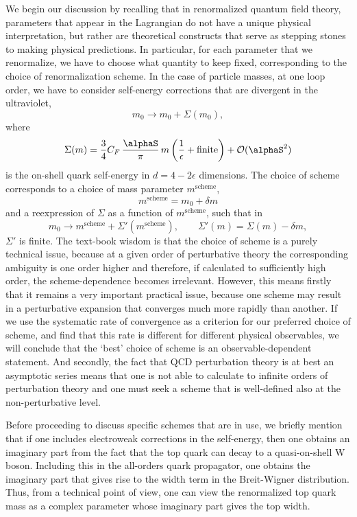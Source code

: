 We begin our discussion by recalling that in renormalized quantum field
theory, parameters that appear in the Lagrangian do not have a unique
physical interpretation, but rather are theoretical constructs that
serve as stepping stones to making physical predictions.  In particular,
for each parameter that we renormalize, we have to choose what quantity
to keep fixed, corresponding to the choice of
renormalization scheme.  In the case of particle masses, at one loop
order, we have to consider self-energy corrections that are divergent in
the ultraviolet,
\begin{equation}
  m_0 \to m_0 + \Sigma(m_0),
\end{equation}
where
\begin{equation}
  \Sigma(m) = \frac34C_F\,\frac{\alphaS}{\pi}\,m\left(\frac1\epsilon
  +\mbox{finite}\right)+\mathcal{O}(\alphaS^2)
\end{equation}
is the on-shell quark self-energy in $d=4-2\epsilon$ dimensions.  The
choice of scheme corresponds to a choice of mass parameter
$m^{\mathrm{scheme}}$,
\begin{equation}
  \label{eq:deltam}
  m^{\mathrm{scheme}}=m_0+\delta m
\end{equation}
and a reexpression of $\Sigma$ as a function of $m^{\mathrm{scheme}}$,
such that in
\begin{equation}
  m_0\to
  m^{\mathrm{scheme}}+\Sigma'(m^{\mathrm{scheme}}),
  \qquad \Sigma'(m)=\Sigma(m)-\delta m,
\end{equation}
$\Sigma'$ is finite.  The text-book wisdom is that the choice of scheme
is a purely technical issue, because at a given order of perturbative
theory the corresponding ambiguity is one order higher and therefore, if
calculated to sufficiently high order, the scheme-dependence becomes
irrelevant.  However, this means firstly that it remains a very
important practical issue, because one scheme may result in a
perturbative expansion that converges much more rapidly than another.
If we use the systematic rate of convergence as a criterion for our
preferred choice of scheme, and find that this rate is different for
different physical observables, we will conclude that the `best' choice
of scheme is an observable-dependent statement.  And secondly, the fact
that QCD perturbation theory is at best an asymptotic series means that
one is not able to calculate to infinite orders of perturbation theory
and one must seek a scheme that is well-defined also at the
non-perturbative level.

Before proceeding to discuss specific schemes that are in use, we
briefly mention that if one includes electroweak corrections in the
self-energy, then one obtains an imaginary part from the fact that the
top quark can decay to a quasi-on-shell W boson.  Including this in the
all-orders quark propagator, one obtains the imaginary part that gives
rise to the width term in the Breit-Wigner distribution.  Thus, from a
technical point of view, one can view the renormalized top quark mass as
a complex parameter whose imaginary part gives the top width.

